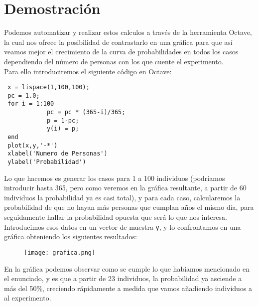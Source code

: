 \documentclass[a4paper]{article}
\begin{document}
\section{Demostración}
Podemos automatizar y realizar estos calculos a través de la herramienta Octave, la cual nos ofrece la posibilidad de contrastarlo en una gráfica para que así veamos mejor el crecimiento de la curva de probabilidades en todos los casos dependiendo del número de personas con los que cuente el experimento.\\
Para ello introduciremos el siguiente código en Octave:
\begin{verbatim}
 x = lispace(1,100,100);
 pc = 1.0;
 for i = 1:100
 			pc = pc * (365-i)/365;
 			p = 1-pc;
 			y(i) = p;
 end
 plot(x,y,'-*')
 xlabel('Numero de Personas')
 ylabel('Probabilidad')
\end{verbatim}
Lo que hacemos es generar los casos para 1 a 100 individuos (podríamos introducir hasta 365, pero como veremos en la gráfica resultante, a partir de 60 individuos la probabilidad ya es casi total), y para cada caso, calcularemos la probabilidad de que no hayan más personas que cumplan años el mismo día, para seguidamente hallar la probabilidad opuesta que será lo que nos interesa. Introducimos esos datos en un vector de muestra \texttt{y}, y lo confrontamos en una gráfica obteniendo los siguientes resultados:

\begin{figure}[h]
\begin{center}
\texttt{[image: grafica.png]}
\end{center}
\end{figure}

En la gráfica podemos observar como se cumple lo que habíamos mencionado en el enunciado, y es que a partir de 23 individuos, la probabilidad ya asciende a más del 50\%, creciendo rápidamente a medida que vamos añadiendo individuos a al experimento.
\end{document}
